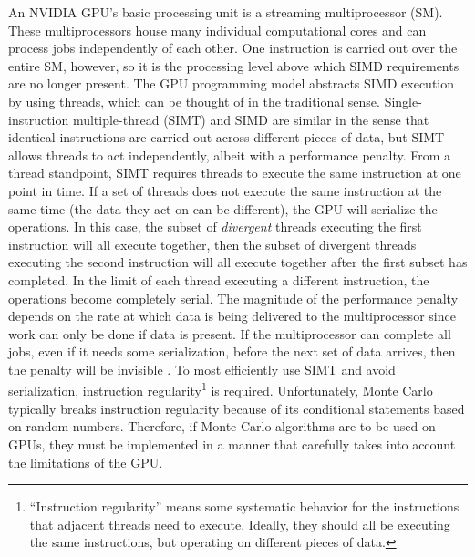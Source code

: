\documentclass[preprint,12pt]{elsarticle}
\begin{document}
An NVIDIA GPU's basic processing unit is a streaming multiprocessor (SM).  These multiprocessors house many individual computational cores and can process jobs independently of each other.  One instruction is carried out over the entire SM, however, so it is the processing level above which SIMD requirements are no longer present.  The GPU programming model abstracts SIMD execution by using threads, which can be thought of in the traditional sense.  Single-instruction multiple-thread (SIMT) and SIMD are similar in the sense that identical instructions are carried out across different pieces of data, but SIMT allows threads to act independently, albeit with a performance penalty.  From a thread standpoint, SIMT requires threads to execute the same instruction at one point in time.  If a set of threads does not execute the same instruction at the same time (the data they act on can be different), the GPU will serialize the operations.  In this case, the subset of \emph{divergent} threads executing the first instruction will all execute together, then the subset of divergent threads executing the second instruction will all execute together after the first subset has completed.  In the limit of each thread executing a different instruction, the operations become completely serial.  The magnitude of the performance penalty depends on the rate at which data is being delivered to the multiprocessor since work can only be done if data is present.  If the multiprocessor can complete all jobs, even if it needs some serialization, before the next set of data arrives, then the penalty will be invisible \cite{cuda}.  To most efficiently use SIMT and avoid serialization, instruction regularity\footnote{``Instruction regularity'' means some systematic behavior for the instructions that adjacent threads need to execute.  Ideally, they should all be executing the same instructions, but operating on different pieces of data.} is required.  Unfortunately, Monte Carlo typically breaks instruction regularity because of its conditional statements based on random numbers.  Therefore, if Monte Carlo algorithms are to be used on GPUs, they must be implemented in a manner that carefully takes into account the limitations of the GPU.  
\end{document}
